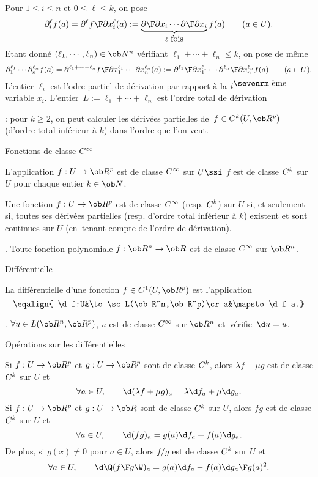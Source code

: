 Pour $1\le i\le n$ et $0\le\ell\le k$, on pose 
$$
\partial_i^\ell f(a)={\partial^\ell f\F\partial x_i^\ell}(a)
:=\underbrace{{\partial\F\partial x_i}\cdots{\partial\F\partial x_i}}_{\ell\mbox{ fois}}f(a)\qquad(a\in U). 
$$
Etant donné $(\ell_1,\cdots,\ell_n)\in\ob N^n$ 
vérifiant $\ell_1+\cdots+\ell_n\le k$, on pose de même 
$$
\partial_1^{\ell_1}\cdots\partial_n^{\ell_n}f(a)={\partial^{\ell_1+\cdots+\ell_n}f\F\partial x_1^{\ell_1}\cdots\partial x_n^{\ell_n}}(a):=
{\partial^{\ell_1}\F\partial x_1^{\ell_1}}\cdots{\partial^{\ell_n}\F\partial x_n^{\ell_n}}f(a)\qquad(a\in U). 
$$
L'entier $\ell_i$ est l'odre partiel de dérivation par rapport à 
la $i^{\mbox{\sevenrm ème}}$ variable $x_i$. \pn
L'entier~$L:=\ell_1+\cdots+\ell_n$ est l'ordre total de dérivation 

\Remarque : pour $k\ge2$, on peut calculer 
les dérivées partielles de~$f\in\sc C^k(U,\ob R^p)$ (d'ordre total inférieur à $k$) 
 dans l'ordre que l'on veut. 
\bigskip

\Concept [] Fonctions de classe $\sc C^\infty$

\Definition [$U$ ouvert de $\ob R^n$] 
L'application $f:U\to\ob R^p$ est de classe $\sc C^\infty$ 
sur $U\ssi$ $f$ est de classe $\sc C^k$ sur $U$ 
pour chaque entier $k\in\ob N$. 

\Propriete [$U$ ouvert de $\ob R^n$, $k\ge1$] 
Une fonction $f:U\to\ob R^p$ est de classe $\sc C^\infty$ (resp. $\sc C^k$) sur $U$ si, et seulement si, toutes ses dérivées partielles 
(resp. d'ordre total inférieur à $k$) existent et sont continues sur $U$ 
(en~tenant compte de l'ordre de dérivation). 

\Exemple. Toute fonction polynomiale $f:\ob R^n\to\ob R$ est de classe $\sc C^\infty$ 
sur $\ob R^n$. 

\Concept Différentielle

\Definition [$U$ ouvert de $\ob R^n$] 
La différentielle d'une fonction $f\in\sc C^1(U,\ob R^p)$ est l'application 
$$
\eqalign{
\d f:U&\to\sc L(\ob R^n,\ob R^p)\cr 
a&\mapsto\d f_a.}
$$
\bigskip

\Exemple. $\forall u\in\sc L(\ob R^n,\ob R^p)$, $u$ 
est de classe $\sc C^\infty$ sur $\ob R^n$ et~vérifie~$\d u=u$. 
\bigskip 

\Concept Opérations sur les différentielles

Si $f:U\to\ob R^p$ et $g:U\to\ob R^p$ sont de classe $\sc C^k$, alors $\lambda f+\mu g$ est de classe $\sc C^k$ sur $U$ et 
$$
\forall a\in U, \qquad \d(\lambda f+\mu g)_a=\lambda\d f_a+\mu\d g_a.
$$
Si $f:U\to\ob R^p$ et $g:U\to\ob R$ sont de classe $\sc C^k$ sur $U$, alors $fg$ est de classe $\sc C^k$ sur $U$ et 
$$
\forall a\in U, \qquad \d(fg)_a=g(a)\d f_a +f(a)\d g_a.
$$ 
De plus, si $g(x)\neq0$ pour $a\in U$, alors $f/g$ est de classe $\sc C^k$ sur $U$ et 
$$
\forall a\in U, \qquad \d\Q({f\F g}\W)_a={g(a)\d f_a-f(a)\d g_a\F g(a)^2}.
$$ 


